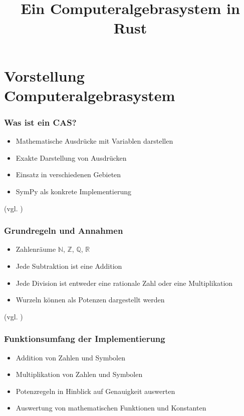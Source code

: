 \documentclass{beamer}
\title{Ein Computeralgebrasystem in Rust}
\begin{document}
\maketitle
{}

\section{Vorstellung Computeralgebrasystem}
\begin{frame}[fragile]
  \frametitle{Was ist ein CAS?}
  \begin{itemize}
    \item Mathematische Ausdrücke mit Variablen darstellen
    \pause
    \item Exakte Darstellung von Ausdrücken
    \pause
    \item Einsatz in verschiedenen Gebieten
    \pause
    \item SymPy als konkrete Implementierung
  \end{itemize}
  {\small (vgl. \cite{FachgruppeDef} \cite[S. 1]{SympyPeerJ})}
\end{frame}

\begin{frame}[fragile]
  \frametitle{Grundregeln und Annahmen}
  \begin{itemize}
    \item Zahlenräume $\mathbb{N}$, $\mathbb{Z}$, $\mathbb{Q}$, $\mathbb{R}$
    \pause
    \item Jede Subtraktion ist eine Addition
    \pause
    \item Jede Division ist entweder eine rationale Zahl oder eine Multiplikation
    \pause
    \item Wurzeln können als Potenzen dargestellt werden
  \end{itemize}
  {\small (vgl. \cite[S. 23 ff.]{Geddes2007} \cite[S. 2]{Tan2000})}
\end{frame}

\begin{frame}[fragile]
  \frametitle{Funktionsumfang der Implementierung}
  \begin{itemize}
    \item Addition von Zahlen und Symbolen
    \pause
    \item Multiplikation von Zahlen und Symbolen
    \pause
    \item Potenzregeln in Hinblick auf Genauigkeit auswerten
    \pause
    \item Auswertung von mathematischen Funktionen und Konstanten
  \end{itemize}
\end{frame}
\end{document}
